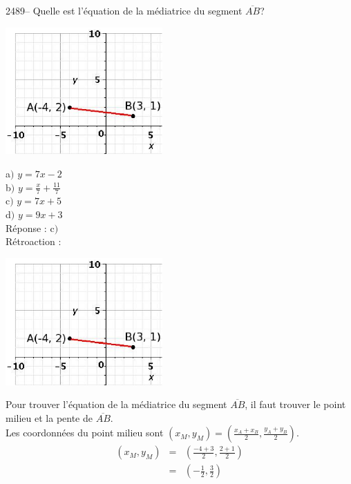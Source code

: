 \documentclass[letterpaper, 12pt]{article}
\begin{document}
2489--  Quelle est l'\'equation de la m\'ediatrice du segment $\overline{AB}$?\\
\begin{center}
 \includegraphics[width=6cm,bb=14 14 329 231]{Q2489.eps}
\end{center}

a$)$ $y=7x-2$\\
b$)$ $y=\frac{x}{7}+\frac{11}{7}$\\
c$)$ $y=7x+5$\\
d$)$ $y=9x+3$\\

R\'eponse : c$)$\\

R\'etroaction :\\
\begin{center}
 \includegraphics[width=6cm,bb=14 14 329 231]{Q2489.eps}
\end{center}
Pour trouver l'\'equation de la m\'ediatrice du segment $\overline{AB}$, il faut trouver le point milieu et la pente de $\overline{AB}$.\\

Les coordonn\'ees du point milieu sont $(x_{M}, y_{M})=\left( \frac{x_{A}+x_{B}}{2}, \frac{y_{A}+y_{B}}{2}\right)$.
\begin{eqnarray*}
(x_{M}, y_{M})&=& \left( \frac{-4+3}{2}, \frac{2+1}{2}\right)\\[2mm]
&=& \left( -\frac{1}{2}, \frac{3}{2}\right)
\end{eqnarray*}
\end{document}
